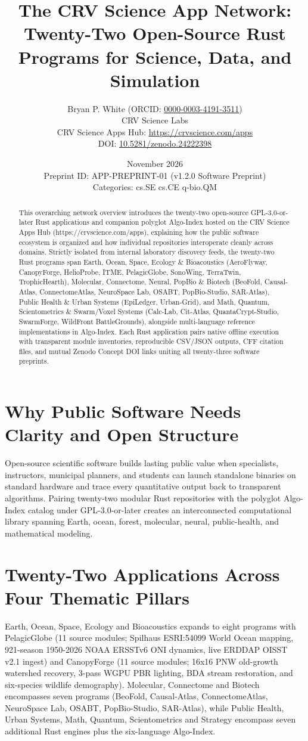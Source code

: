 \documentclass[10pt,letterpaper]{article}
\title{\textbf{The CRV Science App Network: Twenty-Two Open-Source Rust Programs for Science, Data, and Simulation}}
\author{Bryan P. White (ORCID: \href{https://orcid.org/0000-0003-4191-3511}{0000-0003-4191-3511}) \\ CRV Science Labs \\ \small CRV Science Apps Hub: \url{https://crvscience.com/apps} \\ \small DOI: \href{https://doi.org/10.5281/zenodo.24222398}{10.5281/zenodo.24222398}}
\date{November 2026 \\ \small Preprint ID: APP-PREPRINT-01 (v1.2.0 Software Preprint) \\ \small Categories: cs.SE \textbullet{} cs.CE \textbullet{} q-bio.QM}
\begin{document}
\maketitle

\begin{abstract}
This overarching network overview introduces the twenty-two open-source GPL-3.0-or-later Rust applications and companion polyglot Algo-Index hosted on the CRV Science Apps Hub (https://crvscience.com/apps), explaining how the public software ecosystem is organized and how individual repositories interoperate cleanly across domains. Strictly isolated from internal laboratory discovery feeds, the twenty-two Rust programs span Earth, Ocean, Space, Ecology \& Bioacoustics (AeroFlyway, CanopyForge, HelioProbe, ITME, PelagicGlobe, SonoWing, TerraTwin, TrophicHearth), Molecular, Connectome, Neural, PopBio \& Biotech (BeoFold, Causal-Atlas, ConnectomeAtlas, NeuroSpace Lab, OSABT, PopBio-Studio, SAR-Atlas), Public Health \& Urban Systems (EpiLedger, Urban-Grid), and Math, Quantum, Scientometrics \& Swarm/Voxel Systems (Calc-Lab, Cit-Atlas, QuantaCrypt-Studio, SwarmForge, WildFront BattleGrounds), alongside multi-language reference implementations in Algo-Index. Each Rust application pairs native offline execution with transparent module inventories, reproducible CSV/JSON outputs, CFF citation files, and mutual Zenodo Concept DOI links uniting all twenty-three software preprints.
\end{abstract}

\section{Why Public Software Needs Clarity and Open Structure}
Open-source scientific software builds lasting public value when specialists, instructors, municipal planners, and students can launch standalone binaries on standard hardware and trace every quantitative output back to transparent algorithms. Pairing twenty-two modular Rust repositories with the polyglot Algo-Index catalog under GPL-3.0-or-later creates an interconnected computational library spanning Earth, ocean, forest, molecular, neural, public-health, and mathematical modeling.

\section{Twenty-Two Applications Across Four Thematic Pillars}
Earth, Ocean, Space, Ecology and Bioacoustics expands to eight programs with PelagicGlobe (11 source modules; Spilhaus ESRI:54099 World Ocean mapping, 921-season 1950-2026 NOAA ERSSTv6 ONI dynamics, live ERDDAP OISST v2.1 ingest) and CanopyForge (11 source modules; 16x16 PNW old-growth watershed recovery, 3-pass WGPU PBR lighting, BDA stream restoration, and six-species wildlife demography). Molecular, Connectome and Biotech encompasses seven programs (BeoFold, Causal-Atlas, ConnectomeAtlas, NeuroSpace Lab, OSABT, PopBio-Studio, SAR-Atlas), while Public Health, Urban Systems, Math, Quantum, Scientometrics and Strategy encompass seven additional Rust engines plus the six-language Algo-Index.
\end{document}
